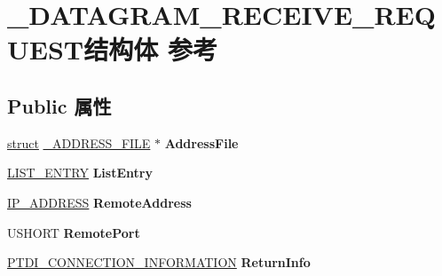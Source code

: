 \hypertarget{struct___d_a_t_a_g_r_a_m___r_e_c_e_i_v_e___r_e_q_u_e_s_t}{}\section{\+\_\+\+D\+A\+T\+A\+G\+R\+A\+M\+\_\+\+R\+E\+C\+E\+I\+V\+E\+\_\+\+R\+E\+Q\+U\+E\+S\+T结构体 参考}
\label{struct___d_a_t_a_g_r_a_m___r_e_c_e_i_v_e___r_e_q_u_e_s_t}
\subsection*{Public 属性}
\begin{DoxyCompactItemize}
\item 
\mbox{\label{struct___d_a_t_a_g_r_a_m___r_e_c_e_i_v_e___r_e_q_u_e_s_t_a3a501b3125684e329e4204db4dfc7ac4}} 
\hyperlink{interfacestruct}{struct} \hyperlink{struct___a_d_d_r_e_s_s___f_i_l_e}{\+\_\+\+A\+D\+D\+R\+E\+S\+S\+\_\+\+F\+I\+LE} $\ast$ {\bfseries Address\+File}
\item 
\mbox{\label{struct___d_a_t_a_g_r_a_m___r_e_c_e_i_v_e___r_e_q_u_e_s_t_a39a19be3f94f09f7b80a1c64ad3a997d}} 
\hyperlink{struct___l_i_s_t___e_n_t_r_y}{L\+I\+S\+T\+\_\+\+E\+N\+T\+RY} {\bfseries List\+Entry}
\item 
\mbox{\label{struct___d_a_t_a_g_r_a_m___r_e_c_e_i_v_e___r_e_q_u_e_s_t_aeb471fd45effca3e4a7926638347daac}} 
\hyperlink{struct_i_p___a_d_d_r_e_s_s}{I\+P\+\_\+\+A\+D\+D\+R\+E\+SS} {\bfseries Remote\+Address}
\item 
\mbox{\label{struct___d_a_t_a_g_r_a_m___r_e_c_e_i_v_e___r_e_q_u_e_s_t_adf8b0bf38272937b69e8dd44216c0666}} 
U\+S\+H\+O\+RT {\bfseries Remote\+Port}
\item 
\mbox{\label{struct___d_a_t_a_g_r_a_m___r_e_c_e_i_v_e___r_e_q_u_e_s_t_ad864b23a1fc8e55f5b67ec14e4f567d6}} 
\hyperlink{struct___t_d_i___c_o_n_n_e_c_t_i_o_n___i_n_f_o_r_m_a_t_i_o_n}{P\+T\+D\+I\+\_\+\+C\+O\+N\+N\+E\+C\+T\+I\+O\+N\+\_\+\+I\+N\+F\+O\+R\+M\+A\+T\+I\+ON} {\bfseries Return\+Info}

\end{DoxyCompactItemize}

